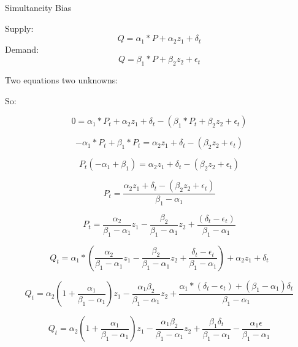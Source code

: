 \documentclass[12pt]{article}
\begin{document}
\title{}
\author{}
\date{}
\maketitle

Simultaneity Bias


Supply:
$$Q=\alpha_1*P+\alpha_2 z_1+\delta_t$$
Demand:
$$Q=\beta_1*P+\beta_2 z_2+\epsilon_t$$

Two equations two unknowns:

So:


$$0=\alpha_1*P_t+\alpha_2 z_1+\delta_t-(\beta_1*P_t+\beta_2 z_2+\epsilon_t)$$

$$-\alpha_1*P_t+\beta_1*P_t=\alpha_2 z_1+\delta_t-(\beta_2 z_2+\epsilon_t)$$

$$P_t(-\alpha_1+\beta_1)=\alpha_2 z_1+\delta_t-(\beta_2 z_2+\epsilon_t)$$


$$P_t= \frac{\alpha_2 z_1+\delta_t-(\beta_2 z_2+\epsilon_t)}{\beta_1-\alpha_1}$$




$$P_t= \frac{\alpha_2}{{\beta_1-\alpha_1}} z_1-\frac{\beta_2}{\beta_1-\alpha_1}z_2 +\frac{(\delta_t-\epsilon_t)}{\beta_1-\alpha_1}$$



$$Q_t=\alpha_1* \left(\frac{\alpha_2}{{\beta_1-\alpha_1}} z_1-\frac{\beta_2}{\beta_1-\alpha_1}z_2 +\frac{\delta_t-\epsilon_t}{\beta_1-\alpha_1}\right)+\alpha_2 z_1+\delta_t$$

$$Q_t=\alpha_2 (1+\frac{\alpha_1}{{\beta_1-\alpha_1}}) z_1-\frac{\alpha_1\beta_2}{\beta_1-\alpha_1}z_2 +\frac{\alpha_1*(\delta_t-\epsilon_t)+(\beta_1-\alpha_1)\delta_t}{\beta_1-\alpha_1}$$


$$Q_t=\alpha_2 (1+\frac{\alpha_1}{{\beta_1-\alpha_1}}) z_1-\frac{\alpha_1\beta_2}{\beta_1-\alpha_1}z_2 +\frac{\beta_1\delta_t}{\beta_1-\alpha_1}-\frac{\alpha_1\epsilon}{\beta_1-\alpha_1}$$
\end{document}
